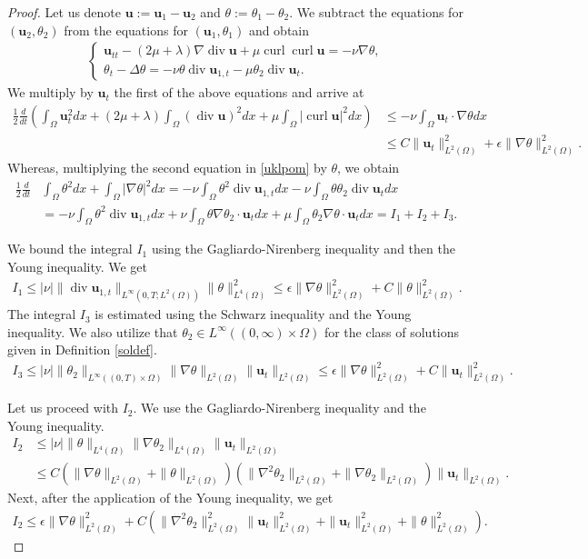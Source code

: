 \documentclass[10pt,a4paper]{amsart}
\newcommand\bb[1]{\mathbf{#1}}
\newcommand{\bu}{\bb{u}}
\DeclareMathOperator{\curl}{curl}
\newcommand{\ddt}{\frac{d}{dt}}
\renewcommand{\div}{\operatorname{div}}
\newcommand{\io}{\int_{\Omega}}
\newcommand{\ld}{L^2(\Omega)}
\newcommand{\ot}{(0,\infty)\times\Omega}
\newcommand{\tn}{\Omega}
\newcommand{\ul}{\frac{1}{2}}
\newcommand{\wspnd}{2\mu+\lambda}
\begin{document}
\begin{proof}
Let us denote $\bu:=\bu_1-\bu_2$ and $\theta:=\theta_1-\theta_2$. We subtract the equations for $(\bu_2,\theta_2)$ from the equations for $(\bu_1,\theta_1)$ and
obtain
\begin{align}\label{uklpom}
\begin{cases}
\bu_{tt}-(\wspnd)\nabla\div\bu+\mu\curl\curl\bu=-\nu\nabla\theta,\\
\theta_t-\Delta\theta=-\nu\theta \div \bu_{1,t}-\mu \theta_2\div \bu_{t}.
\end{cases}
\end{align}
We multiply by $\bu_t$ the first of the above equations and arrive at
\begin{align}\label{glrow1}
\ul\ddt\left(\io \bu_t^2dx+(\wspnd)\io (\div \bu)^2dx+\mu\io |\curl \bu|^2dx \right)&\leq-\nu\io \bu_t\cdot\nabla\theta dx\nonumber\\
&\leq C\|\bu_t\|_{\ld}^2+\epsilon\|\nabla \theta\|^2_{\ld}.
\end{align}
Whereas, multiplying the second equation in \eqref{uklpom} by $\theta$, we obtain
\begin{align}\label{glrow2}
\nonumber\ul\ddt&\io\theta^2 dx+\io|\nabla\theta|^2 dx=-\nu\io\theta^2\div \bu_{1,t}dx-\nu\io\theta\theta_2\div \bu_{t}dx\\
&=-\nu\io\theta^2\div \bu_{1,t}dx+\nu\io\theta\nabla\theta_2\cdot \bu_{t}dx+\mu\io\theta_2\nabla\theta\cdot \bu_{t}dx=I_1+I_2+I_3.
\end{align}

We bound the integral $I_1$ using the Gagliardo-Nirenberg inequality and then the Young inequality. We get
\begin{align}\label{inconde1}
I_1\leq |\nu|\|\div \bu_{1,t}\|_{L^{\infty}(0,T;\ld)}\|\theta\|_{L^4(\tn)}^2\leq \epsilon\|\nabla\theta\|^2_{\ld}+C\|\theta\|_{\ld}^2.
\end{align}
The integral $I_{3}$ is estimated using the Schwarz inequality and the Young inequality. We also utilize that $\theta_2\in L^{\infty}(\ot)$ for the class of solutions given in Definition \ref{soldef}.
\begin{align}\label{inconde2}
I_{3}\leq |\nu|\|\theta_2\|_{L^{\infty}((0,T)\times\tn)}\|\nabla\theta\|_{\ld}\|\bu_t\|_{\ld}\leq \epsilon\|\nabla\theta\|_{\ld}^2+C\|\bu_t\|_{\ld}^2.
\end{align}

Let us proceed with $I_{2}$. We use the Gagliardo-Nirenberg inequality and the Young inequality.
\begin{align*}
I_{2}&\leq |\nu| \|\theta\|_{L^4(\tn)}\|\nabla\theta_2\|_{L^4(\tn)}\|\bu_t\|_{\ld}\\
&\leq C(\|\nabla\theta\|_{\ld}+\|\theta\|_{\ld})(\|\nabla^2\theta_2\|_{\ld}+\|\nabla\theta_2\|_{\ld})\|\bu_t\|_{\ld}.
\end{align*}
Next, after the application of the Young inequality, we get
\begin{align}\label{inconde3}
I_{2}\leq \epsilon\|\nabla\theta\|_{\ld}^2+ C(\|\nabla^2\theta_2\|_{\ld}^2\|\bu_t\|_{\ld}^2+\|\bu_t\|_{\ld}^2+\|\theta\|_{\ld}^2).
\end{align}


\end{proof}
\end{document}
